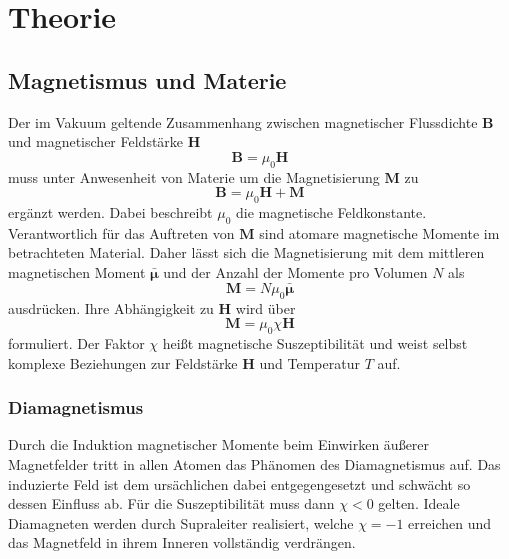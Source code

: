 \section[Theorie]{Theorie \textnormal{\cite{paramagnet}}}
\label{sec:theorie}

\subsection{Magnetismus und Materie}

Der im Vakuum geltende Zusammenhang zwischen magnetischer Flussdichte $\symbf B$ und magnetischer Feldstärke $\symbf H$
\begin{equation}
	\symbf B = \mu_0 \symbf H
	\label{eqn:vakuum}
\end{equation}
muss unter Anwesenheit von Materie um die Magnetisierung $\symbf M$ zu
\begin{equation}
	\symbf B = \mu_0 \symbf H + \symbf M
	\label{eqn:materie}
\end{equation}
ergänzt werden. Dabei beschreibt $\mu_0$ die magnetische Feldkonstante. Verantwortlich für das Auftreten von $\symbf M$
sind atomare magnetische Momente im betrachteten Material. Daher lässt sich die Magnetisierung mit dem mittleren
magnetischen Moment $\bar{\symbf \mu}$ und der Anzahl der Momente pro Volumen $N$ als
\begin{equation}
	\symbf M = N \mu_0 \bar{\symbf \mu}
	\label{eqn:magnet_moment}
\end{equation}
ausdrücken. Ihre Abhängigkeit zu $\symbf H$ wird über
\begin{equation}
	\symbf M = \mu_0 \chi \symbf H
	\label{eqn:magnet_feld}
\end{equation}
formuliert. Der Faktor $\chi$ heißt magnetische Suszeptibilität und weist selbst komplexe Beziehungen zur Feldstärke
$\symbf H$ und Temperatur $T$ auf.

\subsubsection{Diamagnetismus}

Durch die Induktion magnetischer Momente beim Einwirken äußerer Magnetfelder tritt in allen Atomen das Phänomen des
Diamagnetismus auf. Das induzierte Feld ist dem ursächlichen dabei entgegengesetzt und schwächt so dessen Einfluss ab.
Für die Suszeptibilität muss dann $\chi < 0 $ gelten. Ideale Diamagneten werden durch Supraleiter realisiert, welche
$\chi = -1$ erreichen und das Magnetfeld in ihrem Inneren vollständig verdrängen.

